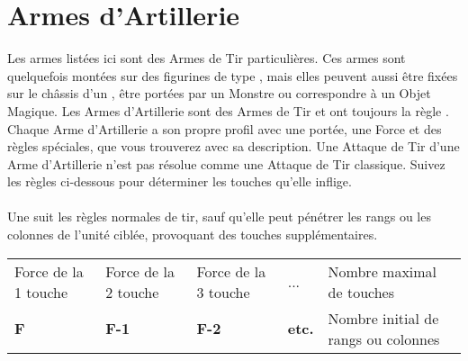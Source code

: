 \newpage
\hypertarget{artilleryweapons}{\section{Armes d'Artillerie}}
\label{artillery_weapons}

Les armes listées ici sont des Armes de Tir particulières. Ces armes sont quelquefois montées sur des figurines de type \warmachine{}, mais elles peuvent aussi être fixées sur le châssis d'un \chariot{}, être portées par un Monstre ou correspondre à un Objet Magique. Les Armes d'Artillerie sont des Armes de Tir et ont toujours la règle \og \reload{} \fg{}. Chaque Arme d'Artillerie a son propre profil avec une portée, une Force et des règles spéciales, que vous trouverez avec sa description. Une Attaque de Tir d'une Arme d'Artillerie n'est pas résolue comme une Attaque de Tir classique. Suivez les règles ci-dessous pour déterminer les touches qu'elle inflige.

\paragraph{\boltthrower}

Une \boltthrower{} suit les règles normales de tir, sauf qu'elle peut pénétrer les rangs ou les colonnes de l'unité ciblée, provoquant des touches supplémentaires. 

{\normalfontsize
\begin{center}
\begin{tabular}{M{2.7cm}M{2.7cm}M{2.7cm}M{1cm}M{4.8cm}}
\hline
Force de la 1\iere{} touche & Force de la 2\ieme{} touche & Force de la 3\ieme{} touche & ... & Nombre maximal de touches\tabularnewline
\textbf{F} & \textbf{F-1} & \textbf{F-2} & \textbf{etc.} & Nombre initial de rangs ou colonnes \tabularnewline
\hline
\end{tabular}
\end{center}
}

